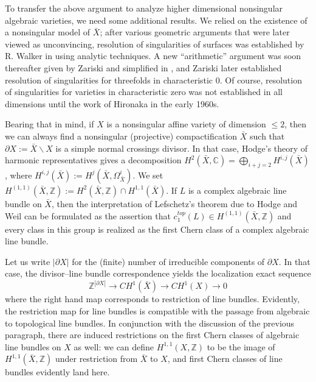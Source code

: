 \documentclass[11pt,leqno]{article}
\newcommand{\cplx}{{\mathbb C}}
\newcommand{\Z}{{\mathbb Z}}
\renewcommand{\1}{{\rm 1\hspace*{-0.4ex}%
\rule{0.1ex}{1.52ex}\hspace*{0.2ex}}}
\newcommand{\<}[1]{{\langle}#1 {\rangle}}
\renewcommand{\setminus}{\smallsetminus}
\theoremstyle{plain}
\theoremstyle{definition}
\theoremstyle{remark}
\numberwithin{equation}{subsection}
\begin{document}
To transfer the above argument to analyze higher dimensional nonsingular algebraic varieties, we need some additional results.  We relied on the existence of a nonsingular model of $\bar{X}$; after various geometric arguments that were later viewed as unconvincing, resolution of singularities of surfaces was established by R. Walker in \cite{Walker1935ReductionSingularities} using analytic techniques.   A new ``arithmetic'' argument was soon thereafter given by Zariski \cite{Zariski1939ReductionSingularities} and simplified in \cite{Zariski1942SimplifiedResolution}, and Zariski later established resolution of singularities for threefolds in characteristic $0$. Of course, resolution of singularities for varieties in characteristic zero was not established in all dimensions until the work of Hironaka in the early 1960s.

Bearing that in mind, if $X$ is a nonsingular affine variety of dimension $\leq 2$, then we can always find a nonsingular (projective) compactification $\bar{X}$ such that $\partial X := \bar{X} \setminus X$ is a simple normal crossings divisor.  In that case, Hodge's theory of harmonic representatives gives a decomposition $H^2(\bar{X},\cplx) = \bigoplus_{i+j=2} H^{i,j}(\bar{X})$, where $H^{i,j}(\bar{X}) := H^j(\bar{X},\Omega^i_{\bar{X}})$.  We set $H^{(1,1)}(\bar{X},\Z) := H^2(\bar{X},\Z) \cap H^{1,1}(\bar{X})$.  If $L$ is a complex algebraic line bundle on $\bar{X}$, then the interpretation of Lefschetz's theorem due to Hodge and Weil can be formulated as the assertion that $c_1^{top}(L) \in H^{(1,1)}(\bar{X},\Z)$ and every class in this group is realized as the first Chern class of a complex algebraic line bundle.

Let us write $|\partial X|$ for the (finite) number of irreducible components of $\partial X$.  In that case, the divisor--line bundle correspondence yields the localization exact sequence
\[
\Z^{|\partial X|} \longrightarrow CH^1(\bar{X}) \longrightarrow CH^1(X) \longrightarrow 0
\]
where the right hand map corresponds to restriction of line bundles.  Evidently, the restriction map for line bundles is compatible with the passage from algebraic to topological line bundles.  In conjunction with the discussion of the previous paragraph, there are induced restrictions on the first Chern classes of algebraic line bundles on $X$ as well: we can define $H^{1,1}(X,\Z)$ to be the image of $H^{1,1}(\bar{X},\Z)$ under restriction from $\bar{X}$ to $X$, and first Chern classes of line bundles evidently land here. 
\end{document}
